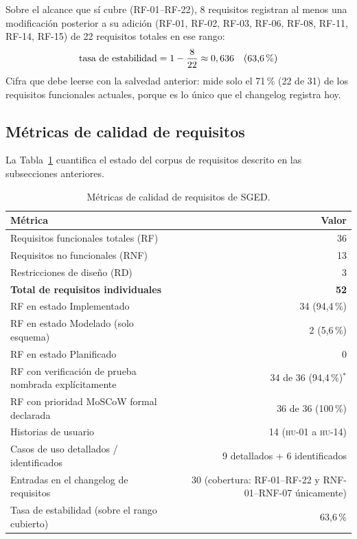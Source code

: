 \documentclass[11pt,a4paper]{article}
\begin{document}
Sobre el alcance que sí cubre (RF-01–RF-22), 8 requisitos registran al
menos una modificación posterior a su adición (RF-01, RF-02, RF-03,
RF-06, RF-08, RF-11, RF-14, RF-15) de 22 requisitos totales en ese rango:
\[
\text{tasa de estabilidad} = 1 - \frac{8}{22} \approx 0,636 \quad \text{(63,6\,\%)}
\]
Cifra que debe leerse con la salvedad anterior: mide solo el 71\,\%
(22 de 31) de los requisitos funcionales actuales, porque es lo único
que el changelog registra hoy.

\subsection{Métricas de calidad de requisitos}

La Tabla~\ref{tab:metricas-requisitos} cuantifica el estado del corpus
de requisitos descrito en las subsecciones anteriores.

\begin{table}[htbp]
\centering
\caption{Métricas de calidad de requisitos de SGED.}
\label{tab:metricas-requisitos}
\begin{tabular}{@{}lr@{}}
\toprule
\textbf{Métrica} & \textbf{Valor} \\
\midrule
Requisitos funcionales totales (RF) & 36 \\
Requisitos no funcionales (RNF) & 13 \\
Restricciones de diseño (RD) & 3 \\
\textbf{Total de requisitos individuales} & \textbf{52} \\
RF en estado Implementado & 34 (94{,}4\,\%) \\
RF en estado Modelado (solo esquema) & 2 (5{,}6\,\%) \\
RF en estado Planificado & 0 \\
RF con verificación de prueba nombrada explícitamente & 34 de 36 (94{,}4\,\%)$^\ast$ \\
RF con prioridad MoSCoW formal declarada & 36 de 36 (100\,\%) \\
Historias de usuario & 14 (\textsc{hu}-01 a \textsc{hu}-14) \\
Casos de uso detallados / identificados & 9 detallados + 6 identificados \\
Entradas en el changelog de requisitos & 30 (cobertura: RF-01–RF-22 y RNF-01–RNF-07 únicamente) \\
Tasa de estabilidad (sobre el rango cubierto) & 63{,}6\,\% \\
\bottomrule
\end{tabular}
\end{table}
\end{document}
